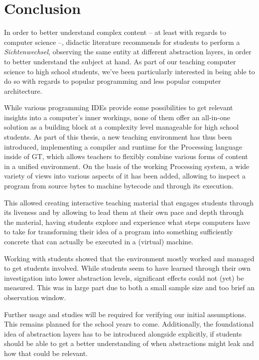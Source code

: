 
\chapter{Conclusion} \label{ch_conclusion}

In order to better understand complex content -- at least with regards to computer science --, didactic literature recommends for students to perform a \emph{Sichtenwechsel}, \ie observing the same entity at different abstraction layers, in order to better understand the subject at hand. As part of our teaching computer science to high school students, we've been particularly interested in being able to do so with regards to popular programming and less popular computer architecture.

While various programming \acp{IDE} provide some possibilities to get relevant insights into a computer's inner workings, none of them offer an all-in-one solution as a building block at a complexity level manageable for high school students. As part of this thesis, a new teaching environment has thus been introduced, implementing a compiler and runtime for the Processing language inside of \acf{GT}, which allows teachers to flexibly combine various forms of content in a unified environment. On the basis of the working Processing system, a wide variety of views into various aspects of it has been added, allowing to inspect a program from source bytes to machine bytecode and through its execution.

This allowed creating interactive teaching material that engages students through its liveness and by allowing to lead them at their own pace and depth through the material, having students explore and experience what steps computers have to take for transforming their idea of a program into something sufficiently concrete that can actually be executed in a (virtual) machine.

Working with students showed that the environment mostly worked and managed to get students involved. While students seem to have learned through their own investigation into lower abstraction levels, significant effects could not (yet) be measured. This was in large part due to both a small sample size and too brief an observation window.

Further usage and studies will be required for verifying our initial assumptions. This remains planned for the school years to come. Additionally, the foundational idea of abstraction layers has to be introduced alongside explicitly, if students should be able to get a better understanding of when abstractions might leak and how that could be relevant.



